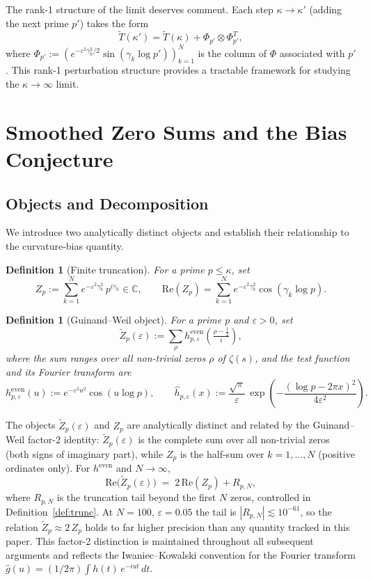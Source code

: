 \documentclass[11pt]{article}
\newtheorem{definition}[theorem]{Definition}
\newcommand{\Tt}{\widetilde{T}}
\newcommand{\Zt}{\widetilde{Z}}
\begin{document}
The rank-1 structure of the limit deserves comment.
Each step $\kappa\to\kappa'$ (adding the next prime $p'$) takes the form
\[
\Tt(\kappa') = \Tt(\kappa) + \Phi_{p'}\otimes\Phi_{p'}^T,
\]
where $\Phi_{p'} := (e^{-\varepsilon^2\gamma_k^2/2}\sin(\gamma_k\log p'))_{k=1}^N$
is the column of $\Phi$ associated with $p'$.
This rank-1 perturbation structure provides a tractable framework for
studying the $\kappa\to\infty$ limit.

\section{Smoothed Zero Sums and the Bias Conjecture}
\label{sec:smoothed}

\subsection{Objects and Decomposition}
\label{ssec:objects}

We introduce two analytically distinct objects and establish their
relationship to the curvature-bias quantity.

\begin{definition}[Finite truncation]
\label{def:Zp}
For a prime $p\leq\kappa$, set
\[
Z_p := \sum_{k=1}^N e^{-\varepsilon^2\gamma_k^2}\,p^{i\gamma_k}\in\mathbb{C},
\qquad
\mathrm{Re}(Z_p) = \sum_{k=1}^N e^{-\varepsilon^2\gamma_k^2}\cos(\gamma_k\log p).
\]
\end{definition}

\begin{definition}[Guinand--Weil object]
\label{def:Ztilde}
For a prime $p$ and $\varepsilon>0$, set
\[
\Zt_p(\varepsilon) := \sum_\rho h^{\mathrm{even}}_{p,\varepsilon}\!\left(\tfrac{\rho-\frac12}{i}\right),
\]
where the sum ranges over all non-trivial zeros $\rho$ of $\zeta(s)$,
and the test function and its Fourier transform are
\[
h^{\mathrm{even}}_{p,\varepsilon}(u) := e^{-\varepsilon^2 u^2}\cos(u\log p),
\qquad
\hat{h}_{p,\varepsilon}(x) := \frac{\sqrt{\pi}}{\varepsilon}\,
  \exp\!\left(-\frac{(\log p - 2\pi x)^2}{4\varepsilon^2}\right).
\]
\end{definition}

The objects $\Zt_p(\varepsilon)$ and $Z_p$ are analytically distinct
and related by the Guinand--Weil factor-2 identity:
$\Zt_p(\varepsilon)$ is the complete sum over all non-trivial zeros
(both signs of imaginary part), while $Z_p$ is the half-sum over
$k=1,\ldots,N$ (positive ordinates only). For $h^{\mathrm{even}}$
and $N\to\infty$,
\[
  \mathrm{Re}\bigl(\Zt_p(\varepsilon)\bigr)
  \;=\; 2\,\mathrm{Re}(Z_p) + R_{p,N},
\]
where $R_{p,N}$ is the truncation tail beyond the first $N$ zeros,
controlled in Definition~\ref{def:trunc}. At $N=100$, $\varepsilon=0.05$
the tail is $|R_{p,N}|\lesssim 10^{-61}$, so the relation
$\Zt_p\approx 2\,Z_p$ holds to far higher precision than any
quantity tracked in this paper.
This factor-2 distinction is maintained throughout all subsequent
arguments and reflects the Iwaniec--Kowalski convention for the
Fourier transform $\hat g(u) = (1/2\pi)\int h(t)\,e^{-iut}\,dt$.
\end{document}

